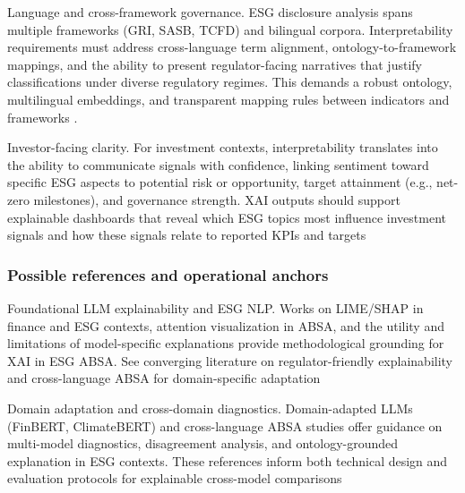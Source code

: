 Language and cross-framework governance. ESG disclosure analysis spans multiple frameworks (GRI, SASB, TCFD) and bilingual corpora. Interpretability requirements must address cross-language term alignment, ontology-to-framework mappings, and the ability to present regulator-facing narratives that justify classifications under diverse regulatory regimes. This demands a robust ontology, multilingual embeddings, and transparent mapping rules between indicators and frameworks \cite{10.1108/medar-11-2021-1486,10.1007/978-3-319-04723-2_7,10.1177/09726225241237304,10.1111/ejed.70225,10.1145/3503044} .

Investor-facing clarity. For investment contexts, interpretability translates into the ability to communicate signals with confidence, linking sentiment toward specific ESG aspects to potential risk or opportunity, target attainment (e.g., net-zero milestones), and governance strength. XAI outputs should support explainable dashboards that reveal which ESG topics most influence investment signals and how these signals relate to reported KPIs and targets \cite{10.48550/arxiv.2510.01222,10.18653/v1/2023.emnlp-main.975,10.1108/dta-01-2024-0065,10.48550/arxiv.2108.01415}

\subsubsection{Possible references and operational anchors}

Foundational LLM explainability and ESG NLP. Works on LIME/SHAP in finance and ESG contexts, attention visualization in ABSA, and the utility and limitations of model-specific explanations provide methodological grounding for XAI in ESG ABSA. See converging literature on regulator-friendly explainability and cross-language ABSA for domain-specific adaptation \cite{10.1002/csr.70089,10.2139/ssrn.3738629,10.1108/mf-01-2023-0020,10.1016/j.inffus.2025.103073,10.1111/eufm.12509,10.48550/arxiv.2511.00024,10.3390/math12193119}

Domain adaptation and cross-domain diagnostics. Domain-adapted LLMs (FinBERT, ClimateBERT) and cross-language ABSA studies offer guidance on multi-model diagnostics, disagreement analysis, and ontology-grounded explanation in ESG contexts. These references inform both technical design and evaluation protocols for explainable cross-model comparisons \cite{10.21203/rs.3.rs-3600821/v1,10.48550/arxiv.2510.01222,10.18653/v1/2023.emnlp-main.975,10.1108/dta-01-2024-0065,10.1145/3630106.3658966,10.21608/msaeng.2023.291899}

